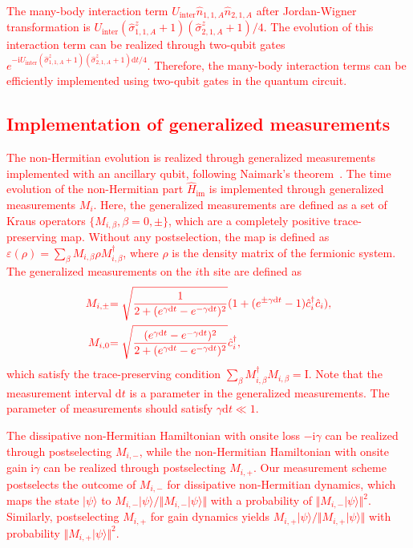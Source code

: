 \documentclass[longbibliography, aps, prx, amsmath, amssymb, amsfonts, twocolumn,superscriptaddress, footinbib]{revtex4-1}
\begin{document}
	\textcolor{red}{The many-body interaction term $U_{\text{inter}} \hat{n}_{1, 1, A} \hat{n}_{2,1,A}$ after Jordan-Wigner transformation is $U_{\text{inter}} (\hat{\sigma}^z_{1,1,A}+1)(\hat{\sigma}^z_{2,1,A}+1)/4$. The evolution of this interaction term can be realized through two-qubit gates $e^{-\mathrm{i} U_{\text{inter}} (\hat{\sigma}^z_{1,1,A}+1) (\hat{\sigma}^z_{2,1,A}+1) \mathrm{d}t/4}$. Therefore, the many-body interaction terms can be efficiently implemented using two-qubit gates in the quantum circuit.}
	
	\subsection{\textcolor{red}{Implementation of generalized measurements}}
	\label{sec:measurement_implementation}
	
	\textcolor{red}{The non-Hermitian evolution is realized through generalized measurements implemented with an ancillary qubit, following Naimark's theorem~\cite{coecke2008povms,nielsen2001quantum}.} \textcolor{red}{The time evolution of the non-Hermitian part $\hat{H}_{\text{im}}$ is implemented through generalized measurements $M_i$. Here, the generalized measurements are defined as a set of Kraus operators $\{M_{i,\beta},\beta=0,\pm \}$, which are a completely positive trace-preserving map. Without any postselection, the map is defined as}
	\textcolor{red}{$\varepsilon(\rho) = \sum_{\beta} M_{i, \beta} \rho M_{i, \beta}^{\dagger}$, where $\rho$ is the density matrix of the fermionic system.}
	\textcolor{red}{The generalized measurements on the $i$th site are defined as}
	\begin{align}
		{\color{red} M_{i,\pm}} &{\color{red} = \sqrt{\frac{1}{2+(e^{\gamma \mathrm{d} t} - e^{-\gamma \mathrm{d} t})^2}} (1 + (e^{\pm \gamma \mathrm{d} t}-1) \hat{c}_i^{\dagger} \hat{c}_i),}\\
		{\color{red} M_{i,0}} &{\color{red} = \sqrt{\frac{(e^{\gamma \mathrm{d} t} - e^{-\gamma \mathrm{d} t})^2}{2+(e^{\gamma \mathrm{d} t} - e^{-\gamma \mathrm{d} t})^2}} \hat{c}_i^{\dagger},}
	\end{align}
	\textcolor{red}{which satisfy the trace-preserving condition $\sum_{\beta} M_{i,\beta}^{\dagger} M_{i,\beta}=\mathrm{I}$. Note that the measurement interval $\mathrm{d}t$ is a parameter in the generalized measurements. The parameter of measurements should satisfy $\gamma \mathrm{d} t \ll 1$.}
	
		\textcolor{red}{The dissipative non-Hermitian Hamiltonian with onsite loss 
$-\mathrm{i}\gamma$ can be realized through postselecting $M_{i,-}$, while the 
non-Hermitian Hamiltonian with onsite gain $\mathrm{i}\gamma$ can be realized 
through postselecting $M_{i,+}$.}
\textcolor{red}{Our measurement scheme postselects the outcome of $M_{i,-}$ 
for dissipative non-Hermitian dynamics, which maps the state $\vert \psi \rangle$ 
to $M_{i,-} \vert \psi \rangle/\Vert M_{i,-} \vert \psi \rangle \Vert$ with a 
probability of $\Vert M_{i,-} \vert \psi \rangle \Vert^2$. Similarly, postselecting 
$M_{i,+}$ for gain dynamics yields $M_{i,+} \vert \psi \rangle/\Vert M_{i,+} 
\vert \psi \rangle \Vert$ with probability $\Vert M_{i,+} \vert \psi \rangle \Vert^2$.}
\end{document}
